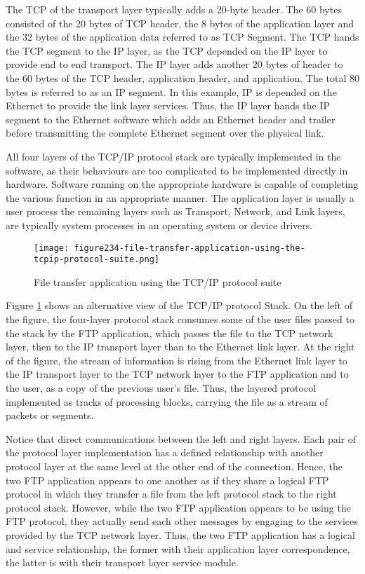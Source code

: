 The TCP of the transport layer typically adds a 20-byte header. The 60 bytes consisted of the 20 bytes of TCP header, the 8 bytes of the application layer and the 32 bytes of the application data referred to as TCP Segment. The TCP hands the TCP segment to the IP layer, as the TCP depended on the IP layer to provide end to end transport. The IP layer adds another 20 bytes of header to the 60 bytes of the TCP header, application header, and application. The total 80 bytes is referred to as an IP segment. In this example, IP is depended on the Ethernet to provide the link layer services. Thus, the IP layer hands the IP segment to the Ethernet software which adds an Ethernet header and trailer before transmitting the complete Ethernet segment over the physical link.

All four layers of the TCP/IP protocol stack are typically implemented in the software, as their behaviours are too complicated to be implemented directly in hardware. Software running on the appropriate hardware is capable of completing the various function in an appropriate manner. The application layer is usually a user process the remaining layers such as Transport, Network, and Link layers, are typically system processes in an operating system or device drivers.

\begin{figure}[H]
\centering
\texttt{[image: figure234-file-transfer-application-using-the-tcpip-protocol-suite.png]}
\caption{File transfer application using the TCP/IP protocol suite \protect\cite{KrzyzstofBook}}
\label{fig:fig234}
\end{figure}

Figure \ref{fig:fig234} shows an alternative view of the TCP/IP protocol Stack. On the left of the figure, the four-layer protocol stack consumes some of the user files passed to the stack by the FTP application, which passes the file to the TCP network layer, then to the IP transport layer than to the Ethernet link layer. At the right of the figure, the stream of information is rising from the Ethernet link layer to the IP transport layer to the TCP network layer to the FTP application and to the user, as a copy of the previous user's file. Thus, the layered protocol implemented as tracks of processing blocks, carrying the file as a stream of packets or segments.

Notice that direct communications between the left and right layers.  Each pair of the protocol layer implementation has a defined relationship with another protocol layer at the same level at the other end of the connection. Hence, the two FTP application appears to one another as if they share a logical FTP protocol in which they transfer a file from the left protocol stack to the right protocol stack. However, while the two FTP application appears to be using the FTP protocol, they actually send each other messages by engaging to the services provided by the TCP network layer. Thus,  the two FTP application has a logical and service relationship, the former with their application layer correspondence, the latter is with their transport layer service module.

